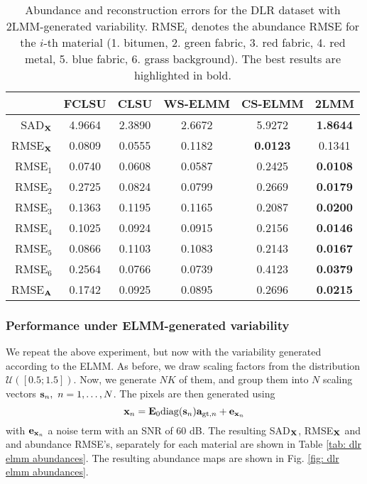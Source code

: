 \begin{table}[htb!]
\caption{Abundance and reconstruction errors for the DLR dataset with 2LMM-generated variability. $\mathrm{RMSE}_i$ denotes the abundance RMSE for the $i$-th material (1. bitumen, 2. green fabric, 3. red fabric, 4. red metal, 5. blue fabric, 6. grass background). The best results  are highlighted in bold. }
\centering
    \begin{tabular}{r|ccccc|}
    \cline{2-6}
    \multicolumn{1}{l|}{}            & FCLSU  & CLSU   & WS-ELMM  & CS-ELMM  & 2LMM \\ \hline \hline
    \multicolumn{1}{|r|}{SAD$_{\mathbf{X}}$}   & 4.9664 & 2.3890 & 2.6672   & 5.9272   & \textbf{1.8644} \\ \hline
    \multicolumn{1}{|r|}{RMSE$_{\mathbf{X}}$}  & 0.0809 & 0.0555 & 0.1182   & \textbf{0.0123}   & 0.1341 \\ \hline \hline
    \multicolumn{1}{|r|}{RMSE$_1$}   & 0.0740 & 0.0608 & 0.0587   & 0.2425   & \textbf{0.0108} \\ \hline
    \multicolumn{1}{|r|}{RMSE$_2$}   & 0.2725 & 0.0824 & 0.0799   & 0.2669   & \textbf{0.0179} \\ \hline
    \multicolumn{1}{|r|}{RMSE$_3$}   & 0.1363 & 0.1195 & 0.1165   & 0.2087   & \textbf{0.0200} \\ \hline
    \multicolumn{1}{|r|}{RMSE$_4$}   & 0.1025 & 0.0924 & 0.0915   & 0.2156   & \textbf{0.0146} \\ \hline
    \multicolumn{1}{|r|}{RMSE$_5$}   & 0.0866 & 0.1103 & 0.1083   & 0.2143   & \textbf{0.0167} \\ \hline
    \multicolumn{1}{|r|}{RMSE$_6$}   & 0.2564 & 0.0766 & 0.0739   & 0.4123   & \textbf{0.0379} \\ \hline \hline
    \multicolumn{1}{|r|}{RMSE$_{\mathbf{A}}$}  & 0.1742 & 0.0925 & 0.0895   & 0.2696   & \textbf{0.0215} \\ \hline
    \end{tabular}
\label{table: dlr hysu 2lmm}
\end{table}

\subsubsection{Performance under ELMM-generated variability}
We repeat the above experiment, but now with the variability generated according to the ELMM. As before, we draw scaling factors from the distribution $\mathcal{U}([0.5;1.5])$. Now, we generate $NK$ of them, and group them into $N$ scaling vectors $\mathbf{s}_n, ~n=1,\ldots, N$. The pixels are then generated using
\begin{equation}
\mathbf{x}_n = \mathbf{E}_0 \mathrm{diag}(\mathbf{s}_n) \mathbf{a}_{\mathrm{gt}, n} + \mathbf{e}_{\mathbf{x}_n}
\end{equation}
with $\mathbf{e}_{\mathbf{x}_n}$ a noise term with an SNR of 60 dB. 
The resulting SAD$_{\mathbf{X}}$, RMSE$_{\mathbf{X}}$ and and abundance RMSE's, separately for each material are shown in Table \ref{tab: dlr elmm abundances}. The resulting abundance maps are shown in Fig. \ref{fig: dlr elmm abundances}.

